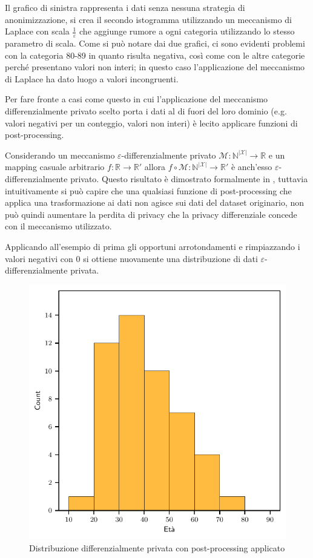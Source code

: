 Il grafico di sinistra rappresenta i dati senza nessuna strategia di anonimizzazione, si crea il secondo istogramma utilizzando un meccanismo di Laplace con scala $\frac{1}{\varepsilon}$ che aggiunge rumore a ogni categoria utilizzando lo stesso parametro di scala. Come si può notare dai due grafici, ci sono evidenti problemi con la categoria 80-89 in quanto risulta negativa, così come con le altre categorie perché presentano valori non interi; in questo caso l'applicazione del meccanismo di Laplace ha dato luogo a valori incongruenti.

Per fare fronte a casi come questo in cui l'applicazione del meccanismo differenzialmente privato scelto porta i dati al di fuori del loro dominio (e.g. valori negativi per un conteggio, valori non interi) è lecito applicare funzioni di post-processing. 

Considerando un meccanismo $\varepsilon$-differenzialmente privato $\mathcal{M} \colon \mathbb{N}^{|\mathcal{X}|} \to \mathbb{R}$ e un mapping casuale arbitrario $f \colon \mathbb{R} \to \mathbb{R}'$ allora $f \circ \mathcal{M} \colon \mathbb{N}^{|\mathcal{X}|} \to \mathbb{R}'$ è anch'esso $\varepsilon$-differenzialmente privato. Questo risultato è dimostrato formalmente in \cite{TCS-042}, tuttavia intuitivamente si può capire che una qualsiasi funzione di post-processing che applica una trasformazione ai dati non agisce sui dati del dataset originario, non può quindi aumentare la perdita di privacy che la privacy differenziale concede con il meccanismo utilizzato.

Applicando all'esempio di prima gli opportuni arrotondamenti e rimpiazzando i valori negativi con 0 si ottiene nuovamente una distribuzione di dati $\varepsilon$-differenzialmente privata.

\begin{figure}[H]
    \centering
    \includegraphics[width=.4\linewidth]{plots/age_histogram_negative_post_processed.pdf}
    \caption{Distribuzione differenzialmente privata con post-processing applicato}
\end{figure}

